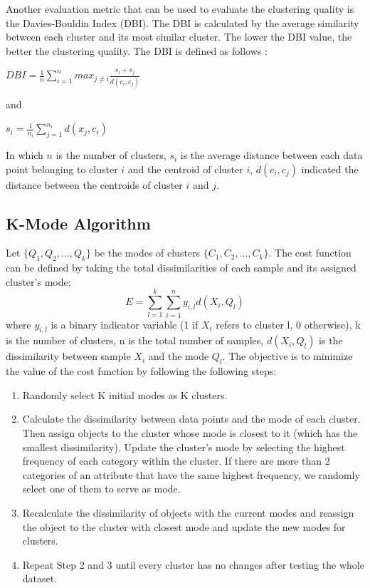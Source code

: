\documentclass{article}
\begin{document}
\noindent Another evaluation metric that can be used to evaluate
the clustering quality is the Davies-Bouldin Index (DBI). The DBI
is calculated by the average similarity between each cluster and its
most similar cluster. The lower the DBI value, the better the clustering
quality. The DBI is defined as follows \citep{HOSEN2023688}:
\begin{center}

$ DBI = \frac{1}{n} \sum_{i=1}^{n} max_{j \neq i} \frac{s_i + s_j}{d(c_i,c_j)}$

\end{center}
and
\begin{center}
$s_i = \frac{1}{n_i} \sum_{j=1}^{n_i} d(x_j,c_i)$
\end{center}
\noindent In which $n$ is the number of clusters, $s_i$ is the average distance between
each data point belonging to cluster $i$ and the centroid of cluster $i$, 
$d(c_i,c_j)$ indicated the distance between the centroids of cluster $i$ and
$j$.

\subsection{K-Mode Algorithm\citep{huang1998extensions}}
Let $\{Q_1,Q_2,...,Q_k\}$ be the modes of clusters $\{C_1,C_2,...,C_k\}$. The cost function can be defined by taking the total dissimilarities of each sample and its assigned cluster's mode: 
$$E = \sum_{l=1}^{k}\sum_{i=1}^{n}y_{i,l}d(X_i,Q_l)$$ 
where $y_{i,l}$ is a binary indicator variable (1 if $X_i$ refers to cluster l, 0 otherwise), k is the number of clusters, n is the total number of samples, $d(X_i,Q_l)$ is the dissimilarity between sample $X_i$ and the mode $Q_l$. The objective is to minimize the value of the cost function by following the following steps: 

\begin{enumerate}
    \item Randomly select K initial modes as K clusters.
    
    \item Calculate the dissimilarity between data points and the mode of each cluster. Then assign objects to the cluster whose mode is closest to it (which has the smallest dissimilarity). Update the cluster’s mode by selecting the highest frequency of each category within the cluster. If there are more than 2 categories of an attribute that have the same highest frequency, we randomly select one of them to serve as mode.
    
    \item Recalculate the dissimilarity of objects with the current modes and reassign the object to the cluster with closest mode and update the new modes for clusters.
    
    \item Repeat Step 2 and 3 until every cluster has no changes after testing the whole dataset.
\end{enumerate}
\end{document}
